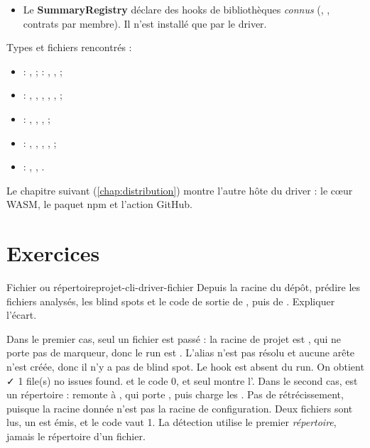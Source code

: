 \begin{resume}
\begin{itemize}
  \item Le \textbf{SummaryRegistry} déclare des hooks de bibliothèques \emph{connus} (, , contrats par membre). Il n'est installé que par le driver.
\end{itemize}
Types et fichiers rencontrés :
\begin{itemize}
  \item {} : ,  ;  : , ,  ;
  \item {} : , , , , ,  ;
  \item {} : , , ,  ;
  \item {} : , , , ,  ;
  \item {} : , , .
\end{itemize}
Le chapitre suivant (\cref{chap:distribution}) montre l'autre hôte du driver : le cœur WASM, le paquet npm et l'action GitHub.
\end{resume}

\section{Exercices}
\label{sec:projet-cli-driver-exercices}

\begin{exercice}{Fichier ou répertoire}{projet-cli-driver-fichier}
Depuis la racine du dépôt, prédire les fichiers analysés, les blind spots et le code de sortie de , puis de . Expliquer l'écart.
\end{exercice}
\begin{solution}
Dans le premier cas, seul un fichier est passé : la racine de projet est , qui ne porte pas de marqueur, donc le run est . L'alias  n'est pas résolu et aucune arête n'est créée, donc il n'y a pas de blind spot. Le hook est absent du run. On obtient \og ✓ 1 file(s) no issues found.\fg{} et le code 0, et seul  montre l'. Dans le second cas,  est un répertoire :  remonte à , qui porte , puis charge les . Pas de rétrécissement, puisque la racine donnée n'est pas la racine de configuration. Deux fichiers sont lus, un \Warning{}  est émis, et le code vaut 1. La détection utilise le premier \emph{répertoire}, jamais le répertoire d'un fichier.
\end{solution}

